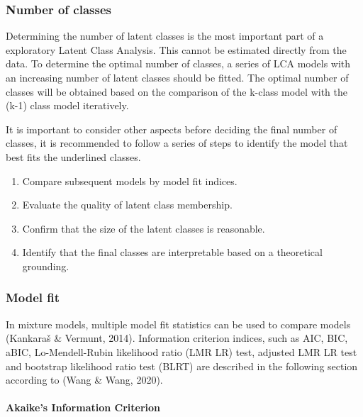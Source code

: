 \documentclass[12pt,a4paper,oneside]{reedthesis}
\providecommand{\tightlist}{%
  \setlength{\itemsep}{0pt}\setlength{\parskip}{0pt}}
\begin{document}
\hypertarget{number-of-classes}{%
\subsubsection{Number of classes}\label{number-of-classes}}

Determining the number of latent classes is the most important part of a exploratory Latent Class Analysis. This cannot be estimated directly from the data. To determine the optimal number of classes, a series of LCA models with an increasing number of latent classes should be fitted. The optimal number of classes will be obtained based on the comparison of the k-class model with the (k-1) class model iteratively.

It is important to consider other aspects before deciding the final number of classes, it is recommended to follow a series of steps to identify the model that best fits the underlined classes.
\begin{enumerate}
\def\labelenumi{\alph{enumi})}
\tightlist
\item
  Compare subsequent models by model fit indices.\\
\item
  Evaluate the quality of latent class membership.\\
\item
  Confirm that the size of the latent classes is reasonable.\\
\item
  Identify that the final classes are interpretable based on a theoretical grounding.
\end{enumerate}
\hypertarget{model-fit}{%
\subsubsection{Model fit}\label{model-fit}}

In mixture models, multiple model fit statistics can be used to compare models (Kankaraš \& Vermunt, 2014). Information criterion indices, such as AIC, BIC, aBIC, Lo-Mendell-Rubin likelihood ratio (LMR LR) test, adjusted LMR LR test and bootstrap likelihood ratio test (BLRT) are described in the following section according to (Wang \& Wang, 2020).

\newpage

\hypertarget{akaikes-information-criterion}{%
\paragraph{Akaike's Information Criterion}\label{akaikes-information-criterion}}
\end{document}
